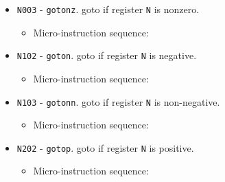 \documentclass{article}
\def\pkptrout{\Verb|0202| - output *\Verb|pk| to data bus}
\def\datatotmpa{\Verb|2402| - write to \Verb|tmpA| from data bus}
\def\tmpatopkifnz{\Verb|0702| - write to \Verb|pk| from \Verb|tmpA| if data bus is nonzero; increment otherwise}
\def\tmpatopkifn{\Verb|0802| - write to \Verb|pk| from \Verb|tmpA| if data bus is negative; increment otherwise}
\def\tmpatopkifnn{\Verb|0902| - write to \Verb|pk| from \Verb|tmpA| if data bus is non-negative; increment otherwise}
\def\tmpatopkifp{\Verb|0a02| - write to \Verb|pk| from \Verb|tmpA| if data bus is positive; increment otherwise}
\def\regtodata#1{\Verb|#1003| - output \Verb|r#1| to data bus}
\def\done{\Verb|fffe| - end instruction}
\begin{document}
\begin{itemize}
    \item \Verb|N003| - \Verb|gotonz|. goto if register \Verb|N| is nonzero.
    \begin{itemize}
        \item Micro-instruction sequence:
    \end{itemize}

    \item \Verb|N102| - \Verb|goton|. goto if register \Verb|N| is negative.
    \begin{itemize}
        \item Micro-instruction sequence:
    \end{itemize}

    \item \Verb|N103| - \Verb|gotonn|. goto if register \Verb|N| is non-negative.
    \begin{itemize}
        \item Micro-instruction sequence:
    \end{itemize}

    
    \item \Verb|N202| - \Verb|gotop|. goto if register \Verb|N| is positive.
    \begin{itemize}
        \item Micro-instruction sequence:
    \end{itemize}


\end{itemize}
\end{document}
